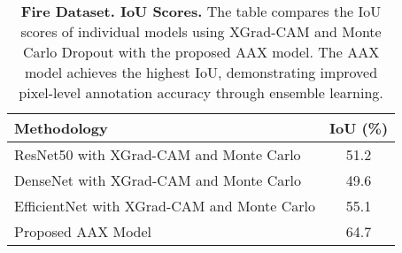
\begin{table}[!h]
\centering
\caption{\textbf{Fire Dataset. IoU Scores.} 
The table compares the IoU scores of individual models using XGrad-CAM and Monte Carlo Dropout with the proposed AAX model. The AAX model achieves the highest IoU, demonstrating improved pixel-level annotation accuracy through ensemble learning.}
\label{tab:iou_performance_fire}
\begin{tabular}{@{}lc@{}}
\toprule
\textbf{Methodology} & \textbf{IoU (\%)} \\ \midrule
ResNet50 with XGrad-CAM and Monte Carlo & 51.2 \\
DenseNet with XGrad-CAM and Monte Carlo & 49.6 \\
EfficientNet with XGrad-CAM and Monte Carlo & 55.1 \\
Proposed AAX Model & 64.7 \\ \bottomrule
\end{tabular}
\end{table}

